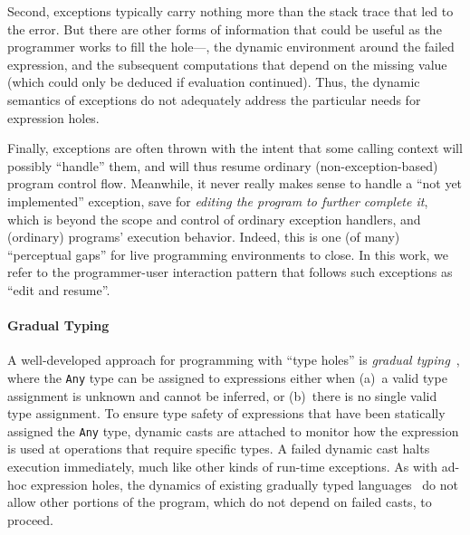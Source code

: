 Second, exceptions typically carry nothing more than the
stack trace that led to the error.
%
But there are other forms of information that could be useful as the programmer
works to fill the hole---\eg{}, the dynamic environment around the failed
expression, and the subsequent computations that depend on the missing value
(which could only be deduced if evaluation continued).
%
Thus, the dynamic semantics of exceptions do not adequately address the
particular needs for expression holes.



Finally, exceptions are often thrown with the intent that some calling
context will possibly ``handle'' them, and will thus resume ordinary
(non-exception-based) program control flow.
%
Meanwhile, it never really makes sense to handle a ``not yet
implemented'' exception, save for \emph{editing the program to further
  complete it}, which is beyond the scope and control of ordinary
exception handlers, and (ordinary) programs' execution behavior.
%
Indeed, this is one (of many) ``perceptual gaps'' for live programming
environments to close.
%
In this work, we refer to the programmer-user interaction pattern that
follows such exceptions as ``edit and resume''.

\paragraph{Gradual Typing}
%
A well-developed approach for programming with ``type holes'' is \emph{gradual
typing}~\cite{XXX,XXX,XXX,XXX}, where the \verb+Any+ type can be assigned to
expressions either when
%
(a)~a valid type assignment is unknown and cannot be inferred, or
%
(b)~there is no single valid type assignment.
%
To ensure type safety of expressions that have been statically assigned the
\verb+Any+ type, dynamic casts are attached to monitor how the expression is
used at operations that require specific types.
%
A failed dynamic cast halts execution immediately, much like other kinds of
run-time exceptions.
%
As with ad-hoc expression holes, the dynamics of existing gradually typed
languages~\cite{XXX,XXX,XXX,XXX} do not allow other portions of the program,
which do not depend on failed casts, to proceed. 

